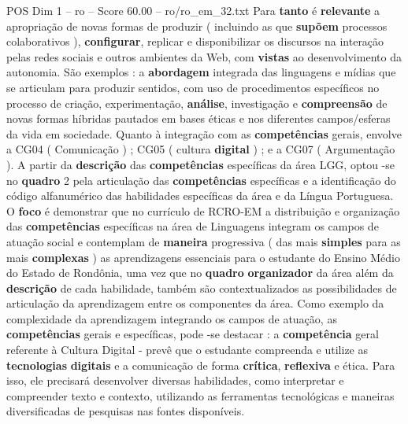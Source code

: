 \begin{textsample}{POS Dim 1 – ro – Score 60.00 – ro/ro\_em\_32.txt}
Para \textbf{tanto} é \textbf{relevante} a apropriação de novas formas de produzir ( incluindo as que \textbf{supõem} processos colaborativos ), \textbf{configurar}, replicar e disponibilizar os discursos na interação pelas redes sociais e outros ambientes da Web, com \textbf{vistas} ao desenvolvimento da autonomia.
São exemplos : a \textbf{abordagem} integrada das linguagens e mídias que se articulam para produzir sentidos, com uso de procedimentos específicos no processo de criação, experimentação, \textbf{análise}, investigação e \textbf{compreensão} de novas formas híbridas pautados em bases éticas e nos diferentes campos/esferas da vida em sociedade.
Quanto à integração com as \textbf{competências} gerais, envolve a CG04 ( Comunicação ) ; CG05 ( cultura \textbf{digital} ) ; e a CG07 ( Argumentação ).
A partir da \textbf{descrição} das \textbf{competências} específicas da área LGG, optou -se no \textbf{quadro} 2 pela articulação das \textbf{competências} específicas e a identificação do código alfanumérico das habilidades específicas da área e da Língua Portuguesa.
O \textbf{foco} é demonstrar que no currículo de RCRO-EM a distribuição e organização das \textbf{competências} específicas na área de Linguagens integram os campos de atuação social e contemplam de \textbf{maneira} progressiva ( das mais \textbf{simples} para as mais \textbf{complexas} ) as aprendizagens essenciais para o estudante do Ensino Médio do Estado de Rondônia, uma vez que no \textbf{quadro} \textbf{organizador} da área além da \textbf{descrição} de cada habilidade, também são contextualizados as possibilidades de articulação da aprendizagem entre os componentes da área.
Como exemplo da complexidade da aprendizagem integrando os campos de atuação, as \textbf{competências} gerais e específicas, pode -se destacar : a \textbf{competência} geral referente à Cultura Digital - prevê que o estudante compreenda e utilize as \textbf{tecnologias} \textbf{digitais} e a comunicação de forma \textbf{crítica}, \textbf{reflexiva} e ética.
Para isso, ele precisará desenvolver diversas habilidades, como interpretar e compreender texto e contexto, utilizando as ferramentas tecnológicas e maneiras diversificadas de pesquisas nas fontes disponíveis.

\end{textsample}
